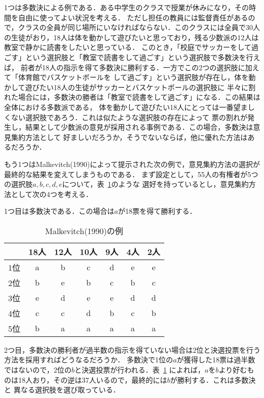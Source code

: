 \documentclass[dvipdfmx]{jsarticle}
\begin{document}
1つは多数決による例である．ある中学生のクラスで授業が休みになり，その時間を自由に使ってよい状況を考える．
ただし担任の教員には監督責任があるので，クラスの全員が同じ場所にいなければならない．このクラスには全員で30人
の生徒がおり，18人は体を動かして遊びたいと思っており，残る少数派の12人は教室で静かに読書をしたいと思っている．
このとき，「校庭でサッカーをして過ごす」という選択肢と「教室で読書をして過ごす」という選択肢で多数決を行えば，
前者が18人の指示を得て多数決に勝利する．一方でこの2つの選択肢に加えて「体育館でバスケットボールを
して過ごす」という選択肢が存在し，体を動かして遊びたい18人の生徒がサッカーとバスケットボールの選択肢に
半々に割れた場合には，多数決の勝者は「教室で読書をして過ごす」になる．この結果は全体における多数派である，
体を動かして遊びたい18人にとっては一番望ましくない選択肢であろう．これは似たような選択肢の存在によって
票の割れが発生し，結果として少数派の意見が採用される事例である．この場合，多数決は意見集約方法として
好ましいだろうか，そうでないならば，他に優れた方法はあるだろうか．

もう1つはMalkevitch(1990)によって提示された次の例で，意見集約方法の選択が最終的な結果を変えてしまうものである．
まず設定として，55人の有権者が5つの選択肢$a,b,c,d,e$について，表~\ref{tab:Malkevitch}のような
選好を持っているとし，意見集約方法として次の4つを考える．

1つ目は多数決である．この場合は$a$が18票を得て勝利する．

\begin{table}[h]
  \caption{Malkevitch(1990)の例}\label{tab:Malkevitch}
  \begin{center}
    \begin{tabular}{c|c|c|c|c|c|c}
      & 18人 & 12人 & 10人 & 9人 & 4人 & 2人 \\ \hline
    1位 & a & b & c & d & e & e \\
    2位 & b & e & b & c & b & c \\
    3位 & e & d & e & e & d & d \\
    4位 & c & c & d & b & c & b \\
    5位 & b & a & a & a & a & a \\
\end{tabular}
  \end{center}
\end{table}

2つ目，多数決の勝利者が過半数の指示を得ていない場合は2位と決選投票を行う方法を採用すればどうなるだろうか．
多数決で1位の$a$が獲得した18票は過半数ではないので，2位の$b$と決選投票が行われる．表~\ref{tab:Malkevitch}
によれば，$a$を$b$より好むものは18人おり，その逆は37人いるので，最終的には$b$が勝利する．これは多数決と
異なる選択肢を選び取っている．
\end{document}
